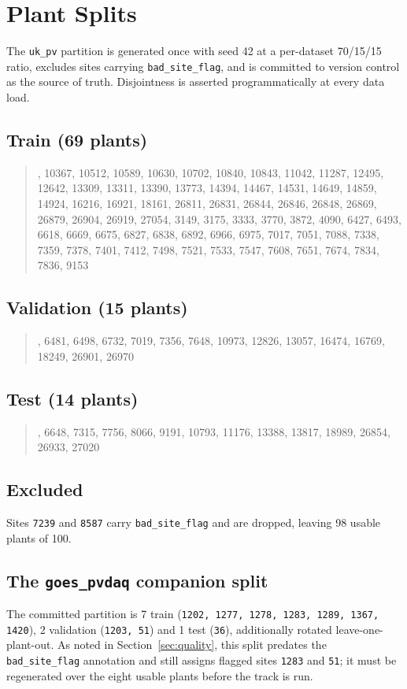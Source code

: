 \chapter{Plant Splits}
\label{app:splits}

The \texttt{uk\_pv} partition is generated once with seed 42 at a per-dataset 70/15/15
ratio, excludes sites carrying \texttt{bad\_site\_flag}, and is committed to version control
as the source of truth. Disjointness is asserted programmatically at every data load.

\section{Train (69 plants)}
\begin{quote}\small{}, 10367, 10512, 10589, 10630, 10702, 10840, 10843, 11042, 11287, 12495, 12642, 13309,
13311, 13390, 13773, 14394, 14467, 14531, 14649, 14859, 14924, 16216, 16921, 18161, 26811,
26831, 26844, 26846, 26848, 26869, 26879, 26904, 26919, 27054, 3149, 3175, 3333, 3770, 3872,
4090, 6427, 6493, 6618, 6669, 6675, 6827, 6838, 6892, 6966, 6975, 7017, 7051, 7088, 7338,
7359, 7378, 7401, 7412, 7498, 7521, 7533, 7547, 7608, 7651, 7674, 7834, 7836, 9153
\end{quote}

\section{Validation (15 plants)}
\begin{quote}\small{}, 6481, 6498, 6732, 7019, 7356, 7648, 10973, 12826, 13057, 16474, 16769, 18249, 26901,
26970
\end{quote}

\section{Test (14 plants)}
\begin{quote}\small{}, 6648, 7315, 7756, 8066, 9191, 10793, 11176, 13388, 13817, 18989, 26854, 26933, 27020
\end{quote}

\section{Excluded}
Sites \texttt{7239} and \texttt{8587} carry \texttt{bad\_site\_flag} and are dropped,
leaving 98 usable plants of 100.

\section{The \texttt{goes\_pvdaq} companion split}
The committed partition is 7 train (\texttt{1202, 1277, 1278, 1283, 1289, 1367, 1420}),
2 validation (\texttt{1203, 51}) and 1 test (\texttt{36}), additionally rotated
leave-one-plant-out. As noted in Section~\ref{sec:quality}, this split predates the
\texttt{bad\_site\_flag} annotation and still assigns flagged sites \texttt{1283} and
\texttt{51}; it must be regenerated over the eight usable plants before the track is run.


